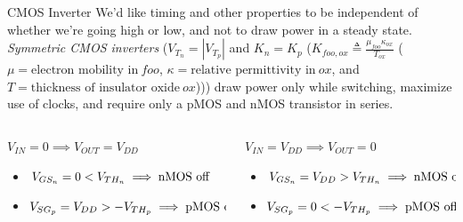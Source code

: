 \documentclass[mathserif,xcolor={dvipsnames,table}]{beamer}
\begin{document}
\begin{frame}{CMOS Inverter}
\scriptsize{We'd like timing and other properties to be independent of whether we're going
high or low, and not to draw power in a steady state. \textit{Symmetric CMOS inverters} ($V_{T_{n}} = |V_{T_{p}}|$ and
$K_n = K_p$ ($K_{foo,ox}\triangleq \frac{\mu_{foo}\kappa_{ox}}{T_{ox}}$
($\mu = \text{electron mobility in}\ foo$,
$\kappa = \text{relative permittivity in}\ ox$,
and $T = \text{thickness of insulator oxide}\ ox$)))
draw power only while switching, maximize use of clocks, and require only 
a pMOS and nMOS transistor in series.}
\vfill
\footnotesize{
\begin{columns}
\begin{column}{.5\textwidth}
$V_{IN} = 0 \implies V_{OUT} = V_{DD}$
\begin{itemize}
\item $V_{GS_{n}} = 0 < V_{TH_{n}}\linebreak
 \implies \text{nMOS off}$
\item $V_{SG_{p}} = V_{DD} > -V_{TH_{p}}\linebreak
 \implies \text{pMOS on}$
\end{itemize}
\end{column}
\begin{column}{.5\textwidth}
$V_{IN} = V_{DD} \implies V_{OUT} = 0$
\begin{itemize}
\item $V_{GS_{n}} = V_{DD} > V_{TH_{n}}\linebreak
 \implies \text{nMOS on}$
\item $V_{SG_{p}} = 0 < -V_{TH_{p}}\linebreak
 \implies \text{pMOS off}$
\end{itemize}
\end{column}
\end{columns}
}
\end{frame}
\end{document}
